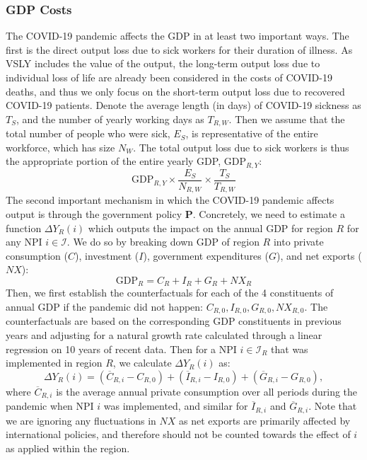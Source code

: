 \documentclass[msom,blindrev]{informs3} %
\begin{document}
\subsubsection*{GDP Costs}
The COVID-19 pandemic affects the GDP in at least two important ways. The first is the direct output loss due to sick workers for their duration of illness. As VSLY includes the value of the output, the long-term output loss due to individual loss of life are already been considered in the costs of COVID-19 deaths, and thus we only focus on the short-term output loss due to recovered COVID-19 patients. Denote the average length (in days) of COVID-19 sickness as $T_S$, and the number of yearly working days as $T_{R,W}$. Then we assume that the total number of people who were sick, $E_S$, is representative of the entire workforce, which has size $N_W$. %
The total output loss due to sick workers is thus the appropriate portion of the entire yearly GDP, $\text{GDP}_{R,Y}$:
\begin{equation}
    \text{GDP}_{R,Y} \times \frac{E_S}{N_{R,W}}\times  \frac{T_S}{T_{R,W}}
\end{equation}
The second important mechanism in which the COVID-19 pandemic affects output is through the government policy $\bm{P}$. Concretely, we need to estimate a function $\Delta Y_R(i)$ which outputs the impact on the annual GDP for region $R$ for any NPI $i \in \mathcal{I}$. We do so by breaking down GDP  of region $R$ into private consumption ($C$), investment ($I$), government expenditures ($G$), and net exports ($NX$):
\[\text{GDP}_R=C_R+I_R+G_R+{NX}_R\]
Then, we first establish the counterfactuals for each of the 4 constituents of annual GDP if the pandemic did not happen: $C_{R,0},I_{R,0},G_{R,0},{NX}_{R,0}$. The counterfactuals are based on the corresponding GDP constituents in previous years and adjusting for a natural growth rate calculated through a linear regression on 10 years of recent data. Then for a NPI $i\in \mathcal{I}_R$ that was implemented in region $R$, we calculate $\Delta Y_R(i)$ as:
\[\Delta Y_R(i)=(\overline{C}_{R,i}-C_{R,0})+(\overline{I}_{R,i}-I_{R,0})  + (\overline{G}_{R,i}-G_{R,0}) ,\]
where $\overline{C}_{R,i}$ is the average annual private consumption over all periods during the pandemic when NPI $i$ was implemented, and similar for $\overline{I}_{R,i}$ and $\overline{G}_{R,i}$. Note that we are ignoring any fluctuations in $NX$ as net exports are primarily affected by international policies, and therefore should not be counted towards the effect of $i$ as applied within the region. 
\end{document}
